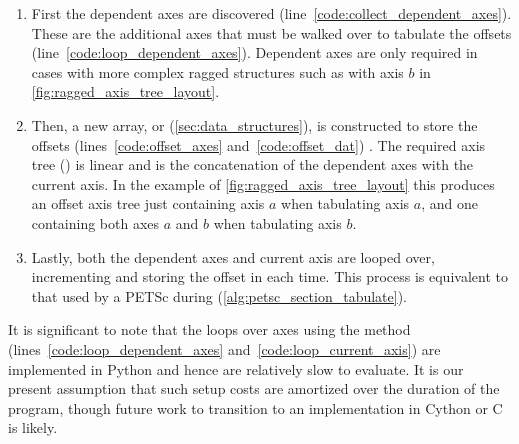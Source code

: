 \documentclass[thesis]{subfiles}
\begin{document}
\begin{enumerate}
  \item
    First the dependent axes are discovered (line~\ref{code:collect_dependent_axes}).
    These are the additional axes that must be walked over to tabulate the offsets (line~\ref{code:loop_dependent_axes}).
    Dependent axes are only required in cases with more complex ragged structures such as with axis $b$ in \cref{fig:ragged_axis_tree_layout}.

  \item
    Then, a new array, or  (\cref{sec:data_structures}), is constructed to store the offsets (lines~\ref{code:offset_axes} and~\ref{code:offset_dat}) .
    The required axis tree () is linear and is the concatenation of the dependent axes with the current axis.
    In the example of \cref{fig:ragged_axis_tree_layout} this produces an offset axis tree just containing axis $a$ when tabulating axis $a$, and one containing both axes $a$ and $b$ when tabulating axis $b$.

  \item
    Lastly, both the dependent axes and current axis are looped over, incrementing and storing the offset in  each time.
    This process is equivalent to that used by a PETSc  during  (\cref{alg:petsc_section_tabulate}).
\end{enumerate}

It is significant to note that the loops over axes using the  method (lines~\ref{code:loop_dependent_axes} and~\ref{code:loop_current_axis}) are implemented in Python and hence are relatively slow to evaluate.
It is our present assumption that such setup costs are amortized over the duration of the program, though future work to transition to an implementation in Cython or C is likely.
\end{document}
